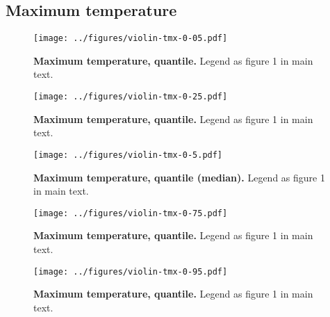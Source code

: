 \documentclass[12pt]{report}
\begin{document}
\subsection{Maximum temperature}
\begin{figure}[h!]
  \begin{center}
    \texttt{[image: ../figures/violin-tmx-0-05.pdf]}
  \end{center}
  \caption{\textbf{Maximum temperature,  quantile.} Legend as
    figure 1 in main text.}
\end{figure}
\begin{figure}[h!]
  \begin{center}
    \texttt{[image: ../figures/violin-tmx-0-25.pdf]}
  \end{center}
  \caption{\textbf{Maximum temperature,  quantile.} Legend as
    figure 1 in main text.}
\end{figure}
\begin{figure}[h!]
  \begin{center}
    \texttt{[image: ../figures/violin-tmx-0-5.pdf]}
  \end{center}
  \caption{\textbf{Maximum temperature,  quantile (median).}
    Legend as figure 1 in main text.}
\end{figure}
\begin{figure}[h!]
  \begin{center}
    \texttt{[image: ../figures/violin-tmx-0-75.pdf]}
  \end{center}
  \caption{\textbf{Maximum temperature,  quantile.} Legend as
    figure 1 in main text.}
\end{figure}
\begin{figure}[h!]
  \begin{center}
    \texttt{[image: ../figures/violin-tmx-0-95.pdf]}
  \end{center}
  \caption{\textbf{Maximum temperature,  quantile.} Legend as
    figure 1 in main text.}
\end{figure}

\clearpage
\end{document}
